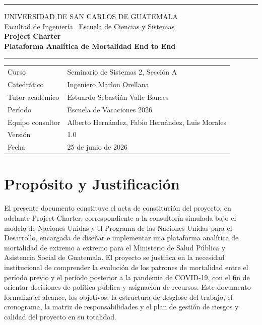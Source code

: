 \documentclass[12pt,a4paper]{article}
\begin{document}
\thispagestyle{primerapagina}

\vspace*{0.4cm}
{\color{grisclaro}\rule{\linewidth}{1.2pt}}
\vspace{6pt}

\begin{center}
  {\fontsize{9}{11}\selectfont\color{grismedio}%
   \MakeUppercase{Universidad de San Carlos de Guatemala}\\[2pt]
   Facultad de Ingeniería \textendash\ Escuela de Ciencias y Sistemas}\\[10pt]
  {\fontsize{16}{20}\selectfont\bfseries\color{negro}
   Project Charter\\[4pt]
   Plataforma Analítica de Mortalidad End to End}
\end{center}

\vspace{6pt}
{\color{grisclaro}\rule{\linewidth}{1.2pt}}
\vspace{14pt}

{\small
\begin{tabular}{@{}p{3.8cm} p{9.8cm}@{}}
  \color{grismedio}Curso            & Seminario de Sistemas 2, Sección A \\[3pt]
  \color{grismedio}Catedrático      & Ingeniero Marlon Orellana \\[3pt]
  \color{grismedio}Tutor académico  & Estuardo Sebastián Valle Bances \\[3pt]
  \color{grismedio}Período          & Escuela de Vacaciones 2026 \\[3pt]
  \color{grismedio}Equipo consultor & Alberto Hernández, Fabio Hernández, Luis Morales \\[3pt]
  \color{grismedio}Versión          & 1.0 \\[3pt]
  \color{grismedio}Fecha            & 25 de junio de 2026 \\
\end{tabular}
}

\newpage
\section{Propósito y Justificación}

El presente documento constituye el acta de constitución del proyecto, en adelante Project
Charter, correspondiente a la consultoría simulada bajo el modelo de Naciones Unidas y el
Programa de las Naciones Unidas para el Desarrollo, encargada de diseñar e implementar una
plataforma analítica de mortalidad de extremo a extremo para el Ministerio de Salud Pública y
Asistencia Social de Guatemala. El proyecto se justifica en la necesidad institucional de
comprender la evolución de los patrones de mortalidad entre el período previo y el período
posterior a la pandemia de COVID-19, con el fin de orientar decisiones de política pública y
asignación de recursos. Este documento formaliza el alcance, los objetivos, la estructura de
desglose del trabajo, el cronograma, la matriz de responsabilidades y el plan de gestión de
riesgos y calidad del proyecto en su totalidad.
\end{document}
